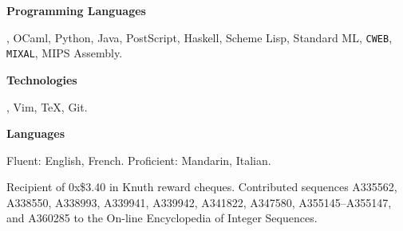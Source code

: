 
{\bf Programming Languages}\par
\CEE, OCaml, Python, Java, PostScript, Haskell, Scheme Lisp,  Standard ML, {\tt CWEB}, {\tt MIXAL},
{\mc MIPS} Assembly.
\medbreak

{\bf Technologies}\par
\UNIX, Vim, \TeX, Git.
\medbreak

{\bf Languages}\par
Fluent: English, French. Proficient: Mandarin, Italian.
\medbreak


\parindent=10pt
\thing Recipient of 0x\$3.40 in Knuth reward cheques.
\smallskip
\thing Contributed sequences A335562, A338550, A338993, A339941, A339942, A341822, A347580,
A355145--A355147, and A360285
to the On-line Encyclopedia of Integer Sequences.
\medbreak

\filbreak

\bye

